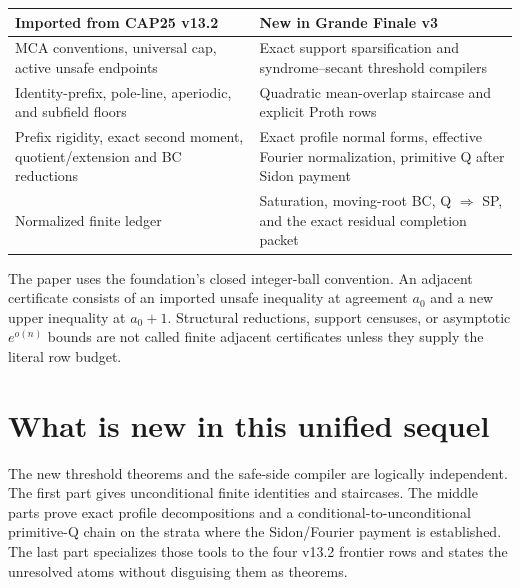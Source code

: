 \documentclass[11pt,a4paper]{amsart}
\numberwithin{equation}{section}
\theoremstyle{remark}
\begin{document}
\begin{center}
\begin{tabular}{@{}>{\raggedright\arraybackslash}p{}>{\raggedright\arraybackslash}p{}@{}}
\toprule
Imported from CAP25 v13.2 & New in Grande Finale v3\\
\midrule
MCA conventions, universal cap, active unsafe endpoints & Exact support sparsification and syndrome--secant threshold compilers\\
Identity-prefix, pole-line, aperiodic, and subfield floors & Quadratic mean-overlap staircase and explicit Proth rows\\
Prefix rigidity, exact second moment, quotient/extension and BC reductions & Exact profile normal forms, effective Fourier normalization, primitive Q after Sidon payment\\
Normalized finite ledger & Saturation, moving-root BC, Q $\Rightarrow$ SP, and the exact residual completion packet\\
\bottomrule
\end{tabular}
\end{center}

The paper uses the foundation's closed integer-ball convention.  An adjacent certificate consists of an imported unsafe inequality at agreement $a_0$ and a new upper inequality at $a_0+1$.  Structural reductions, support censuses, or asymptotic $e^{o(n)}$ bounds are not called finite adjacent certificates unless they supply the literal row budget.

\section{What is new in this unified sequel}\label{sec:new-contributions}
The new threshold theorems and the safe-side compiler are logically independent.  The first part gives unconditional finite identities and staircases.  The middle parts prove exact profile decompositions and a conditional-to-unconditional primitive-Q chain on the strata where the Sidon/Fourier payment is established.  The last part specializes those tools to the four v13.2 frontier rows and states the unresolved atoms without disguising them as theorems.
\end{document}
